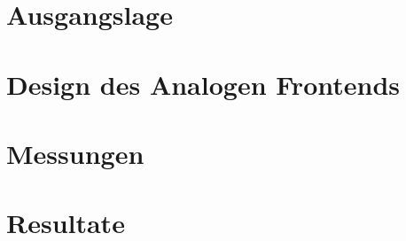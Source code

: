 \documentclass{fhnwreport} %
\begin{document}
\newpage

\section{Ausgangslage}
\label{sec:ausgangslage}


\newpage

\section{Design des Analogen Frontends}
\label{sec:afe}


\newpage

\section{Messungen}
\label{sec:messungen}


\newpage

\section{Resultate}
\label{sec:resultate}



\end{document}
